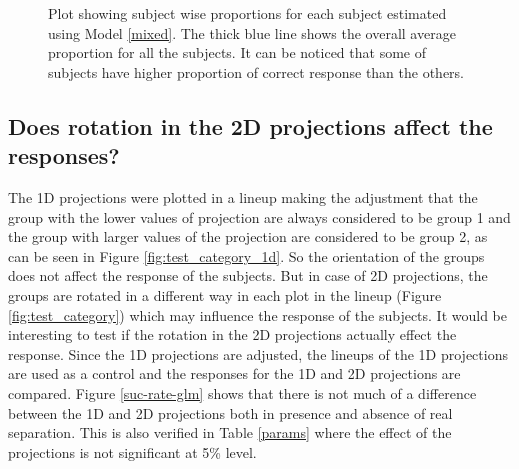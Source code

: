 \documentclass[12]{article}
\begin{document}
\begin{figure}[ht]
   \centering
      \caption{Plot showing subject wise proportions for each subject estimated using Model \ref{mixed}. The thick blue line shows the overall average proportion for all the subjects. It can be noticed that some of subjects have higher proportion of correct response than the others. }
       \label{subject-glm}
\end{figure}


\subsection{Does rotation in the 2D projections affect the responses?}

The 1D projections were plotted in a lineup making the adjustment that the group with the lower values of projection are always considered to be group 1 and the group with larger values of the projection are considered to be group 2, as can be seen in Figure \ref{fig:test_category_1d}. So the orientation of the groups does not affect the response of the subjects. But in case of 2D projections, the groups are rotated in a different way in each plot in the lineup (Figure \ref{fig:test_category}) which may influence the response of the subjects. It would be interesting to test if the rotation in the 2D projections actually effect the response. Since the 1D projections are adjusted, the lineups of the 1D projections are used as a control and the responses for the 1D and 2D projections are compared. Figure \ref{suc-rate-glm} shows that there is not much of a difference between the 1D and 2D projections both in presence and absence of real separation. This is also verified in Table \ref{params} where the effect of the projections is not significant at 5\% level.  
\end{document}
